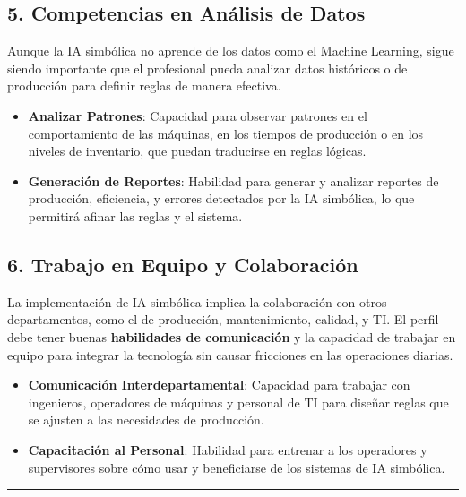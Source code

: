 \documentclass[
  10pt,
  letterpaper,
]{book}
\providecommand{\tightlist}{%
  \setlength{\itemsep}{0pt}\setlength{\parskip}{0pt}}\usepackage{longtable,booktabs,array}
\begin{document}
\subsection{\texorpdfstring{\textbf{5. Competencias en Análisis de
Datos}}{5. Competencias en Análisis de Datos}}\label{competencias-en-anuxe1lisis-de-datos}

Aunque la IA simbólica no aprende de los datos como el Machine Learning,
sigue siendo importante que el profesional pueda analizar datos
históricos o de producción para definir reglas de manera efectiva.

\begin{itemize}
\tightlist
\item
  \textbf{Analizar Patrones}: Capacidad para observar patrones en el
  comportamiento de las máquinas, en los tiempos de producción o en los
  niveles de inventario, que puedan traducirse en reglas lógicas.
\item
  \textbf{Generación de Reportes}: Habilidad para generar y analizar
  reportes de producción, eficiencia, y errores detectados por la IA
  simbólica, lo que permitirá afinar las reglas y el sistema.
\end{itemize}

\subsection{\texorpdfstring{\textbf{6. Trabajo en Equipo y
Colaboración}}{6. Trabajo en Equipo y Colaboración}}\label{trabajo-en-equipo-y-colaboraciuxf3n}

La implementación de IA simbólica implica la colaboración con otros
departamentos, como el de producción, mantenimiento, calidad, y TI. El
perfil debe tener buenas \textbf{habilidades de comunicación} y la
capacidad de trabajar en equipo para integrar la tecnología sin causar
fricciones en las operaciones diarias.

\begin{itemize}
\tightlist
\item
  \textbf{Comunicación Interdepartamental}: Capacidad para trabajar con
  ingenieros, operadores de máquinas y personal de TI para diseñar
  reglas que se ajusten a las necesidades de producción.
\item
  \textbf{Capacitación al Personal}: Habilidad para entrenar a los
  operadores y supervisores sobre cómo usar y beneficiarse de los
  sistemas de IA simbólica.
\end{itemize}

\begin{center}\rule{0.5\linewidth}{0.5pt}\end{center}
\end{document}
